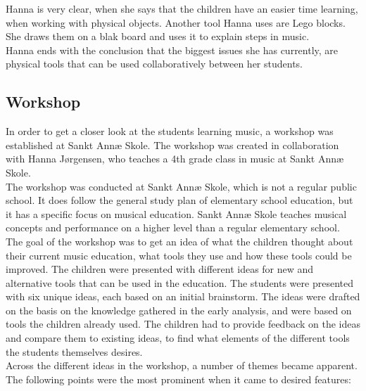 Hanna is very clear, when she says that the children have an easier time learning, when working with physical objects. Another tool Hanna uses are Lego blocks. She draws them on a blak board and uses it to explain steps in music. \\

Hanna ends with the conclusion that the biggest issues she has currently, are physical tools that can be used collaboratively between her students.\\


\subsection{Workshop}\label{sec:workshop}
In order to get a closer look at the students learning music, a workshop was established at Sankt Annæ Skole. The workshop was created in collaboration with Hanna Jørgensen, who teaches a 4th grade class in music at Sankt Annæ Skole.\\

The workshop was conducted at Sankt Annæ Skole, which is not a regular public school. It does follow the general study plan of elementary school education, but it has a specific focus on musical education. Sankt Annæ Skole teaches musical concepts and performance on a higher level than a regular elementary school. \\

The goal of the workshop was to get an idea of what the children thought about their current music education, what tools they use and how these tools could be improved. The children were presented with different ideas for new and alternative tools that can be used in the education. The students were presented with six unique ideas, each based on an initial brainstorm. The ideas were drafted on the basis on the knowledge gathered in the early analysis, and were based on tools the children already used. The children had to provide feedback on the ideas and compare them to existing ideas, to find what elements of the different tools the students themselves desires.\\

Across the different ideas in the workshop, a number of themes became apparent. The following points were the most prominent when it came to desired features:\\



